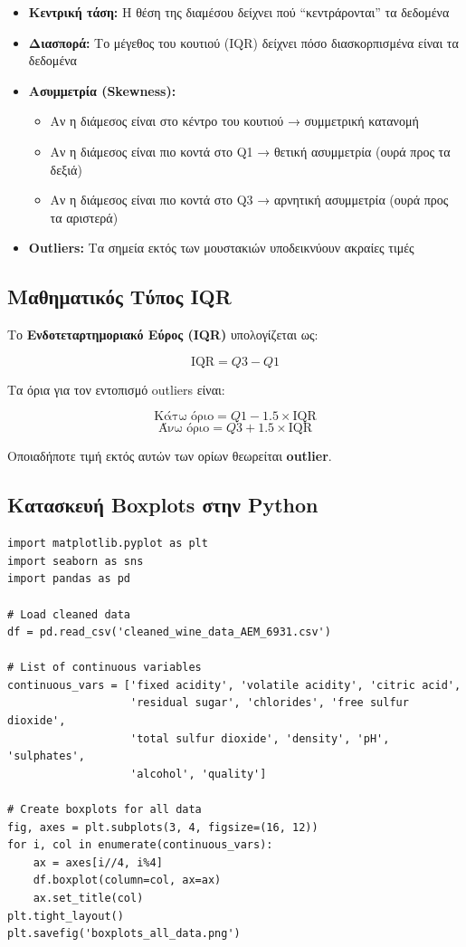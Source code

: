 \documentclass[12pt,a4paper]{article}
\begin{document}
\begin{itemize}
    \item \textbf{Κεντρική τάση:} Η θέση της διαμέσου δείχνει πού ``κεντράρονται'' τα δεδομένα
    \item \textbf{Διασπορά:} Το μέγεθος του κουτιού (IQR) δείχνει πόσο διασκορπισμένα είναι τα δεδομένα
    \item \textbf{Ασυμμετρία (Skewness):}
    \begin{itemize}
        \item Αν η διάμεσος είναι στο κέντρο του κουτιού → συμμετρική κατανομή
        \item Αν η διάμεσος είναι πιο κοντά στο Q1 → θετική ασυμμετρία (ουρά προς τα δεξιά)
        \item Αν η διάμεσος είναι πιο κοντά στο Q3 → αρνητική ασυμμετρία (ουρά προς τα αριστερά)
    \end{itemize}
    \item \textbf{Outliers:} Τα σημεία εκτός των μουστακιών υποδεικνύουν ακραίες τιμές
\end{itemize}

\subsection{Μαθηματικός Τύπος IQR}

Το \textbf{Ενδοτεταρτημοριακό Εύρος (IQR)} υπολογίζεται ως:

$$\text{IQR} = Q3 - Q1$$

Τα όρια για τον εντοπισμό outliers είναι:

$$\text{Κάτω όριο} = Q1 - 1.5 \times \text{IQR}$$
$$\text{Άνω όριο} = Q3 + 1.5 \times \text{IQR}$$

Οποιαδήποτε τιμή εκτός αυτών των ορίων θεωρείται \textbf{outlier}.

\subsection{Κατασκευή Boxplots στην Python}

\begin{lstlisting}
import matplotlib.pyplot as plt
import seaborn as sns
import pandas as pd

# Load cleaned data
df = pd.read_csv('cleaned_wine_data_AEM_6931.csv')

# List of continuous variables
continuous_vars = ['fixed acidity', 'volatile acidity', 'citric acid',
                   'residual sugar', 'chlorides', 'free sulfur dioxide',
                   'total sulfur dioxide', 'density', 'pH', 'sulphates',
                   'alcohol', 'quality']

# Create boxplots for all data
fig, axes = plt.subplots(3, 4, figsize=(16, 12))
for i, col in enumerate(continuous_vars):
    ax = axes[i//4, i%4]
    df.boxplot(column=col, ax=ax)
    ax.set_title(col)
plt.tight_layout()
plt.savefig('boxplots_all_data.png')
\end{lstlisting}
\end{document}
